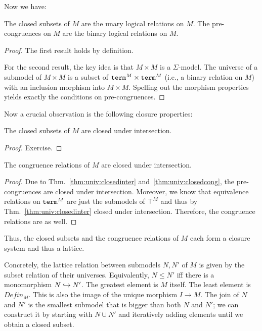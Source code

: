 Now we have:
\begin{theorem}\label{thm:univ:closedcong}
The closed subsets of $M$ are the unary logical relations on $M$.
The pre-congruences on $M$ are the binary logical relations on $M$.
\end{theorem}
\begin{proof}
The first result holds by definition.

For the second result, the key idea is that $M\times M$ is a $\Sigma$-model.
The universe of a submodel of $M\times M$ is a subset of $\mathtt{term}^M\times\mathtt{term}^M$ (i.e., a binary relation on $M$) with an inclusion morphism into $M\times M$.
Spelling out the morphism properties yields exactly the conditions on pre-congruences.
\end{proof}

Now a crucial observation is the following closure properties:

\begin{theorem}\label{thm:univ:closedinter}
The closed subsets of $M$ are closed under intersection.
\end{theorem}
\begin{proof}
Exercise.
\end{proof}

\begin{theorem}
The congruence relations of $M$ are closed under intersection.
\end{theorem}
\begin{proof}
Due to Thm.~\ref{thm:univ:closedinter} and~\ref{thm:univ:closedcong}, the pre-congruences are closed under intersection.
Moreover, we know that equivalence relations on $\mathtt{term}^M$ are just the submodels of $\top^M$ and thus by Thm.~\ref{thm:univ:closedinter} closed under intersection.
Therefore, the congruence relations are as well.
\end{proof}

Thus, the closed subsets and the congruence relations of $M$ each form a closure system and thus a lattice.

Concretely, the lattice relation between submodels $N,N'$ of $M$ is given by the subset relation of their universes.
Equivalently, $N\leq N'$ iff there is a monomorphism $N\hookrightarrow N'$.
The greatest element is $M$ itself.
The least element is $Defin_M$. This is also the image of the unique morphism $I\to M$.
The join of $N$ and $N'$ is the smallest submodel that is bigger than both $N$ and $N'$; we can construct it by starting with $N\cup N'$ and iteratively adding elements until we obtain a closed subset.

